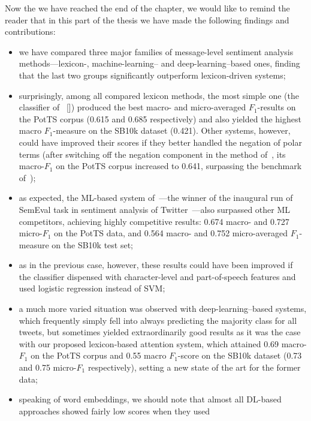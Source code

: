 \documentclass[11pt]{article}
\newcommand{\F}[0]{$F_1$}
\begin{document}
Now the we have reached the end of the chapter, we would like to
remind the reader that in this part of the thesis we have made the
following findings and contributions:
\begin{itemize}
  \item we have compared three major families of message-level
    sentiment analysis methods---lexicon-, machine-learning-- and
    deep-learning--based ones, finding that the last two groups
    significantly outperform lexicon-driven systems;
  \item surprisingly, among all compared lexicon methods, the most
    simple one (the classifier of~\citeauthor{Hu:04}
    [\citeyear{Hu:04}]) produced the best macro- and micro-averaged
    \F{}-results on the PotTS corpus (0.615 and 0.685 respectively)
    and also yielded the highest macro \F{}-measure on the SB10k
    dataset (0.421).  Other systems, however, could have improved
    their scores if they better handled the negation of polar terms
    (after switching off the negation component in the method
    of~\citeauthor{Musto:14}, its macro-\F{} on the PotTS corpus
    increased to 0.641, surpassing the benchmark
    of~\citeauthor{Hu:04});
  \item as expected, the ML-based system of~\citet{Mohammad:13}---the
    winner of the inaugural run of SemEval task in sentiment analysis
    of Twitter~\cite{Nakov:13}---also surpassed other ML competitors,
    achieving highly competitive results: 0.674 macro- and 0.727
    micro-\F{} on the PotTS data, and 0.564 macro- and 0.752
    micro-averaged \F{}-measure on the SB10k test set;
  \item as in the previous case, however, these results could have
    been improved if the classifier dispensed with character-level and
    part-of-speech features and used logistic regression instead of
    SVM;
  \item a much more varied situation was observed with
    deep-learning--based systems, which frequently simply fell into
    always predicting the majority class for all tweets, but sometimes
    yielded extraordinarily good results as it was the case with our
    proposed lexicon-based attention system, which attained 0.69
    macro-\F{} on the PotTS corpus and 0.55 macro \F{}-score on the
    SB10k dataset (0.73 and 0.75 micro-\F{} respectively), setting a
    new state of the art for the former data;
  \item speaking of word embeddings, we should note that almost all
    DL-based approaches showed fairly low scores when they used

\end{itemize}
\end{document}
